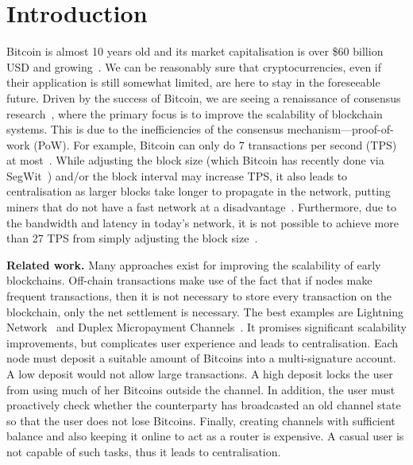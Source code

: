 \section{Introduction}

Bitcoin is almost 10 years old and its market capitalisation is over \$60 billion USD and growing~\cite{bitcoinmarketcap}.
We can be reasonably sure that cryptocurrencies,
even if their application is still somewhat limited,
are here to stay in the foreseeable future.
Driven by the success of Bitcoin, we are seeing a renaissance of consensus research~\cite{miller2016honey, kogias2016enhancing, kokoris2017omniledger},
where the primary focus is to improve the scalability of blockchain systems.
This is due to the inefficiencies of the consensus mechanism---proof-of-work (PoW).
For example, Bitcoin can only do 7 transactions per second (TPS) at most~\cite{vukolic2015quest}.
While adjusting the block size (which Bitcoin has recently done via SegWit~\cite{segwit}) and/or the block interval may increase TPS,
it also leads to centralisation as larger blocks take longer to propagate in the network,
putting miners that do not have a fast network at a disadvantage~\cite{croman2016scaling}.
Furthermore, due to the bandwidth and latency in today's network,
it is not possible to achieve more than 27 TPS from simply adjusting the block size~\cite{croman2016scaling}.

\textbf{Related work.\quad}
Many approaches exist for improving the scalability of early blockchains.
Off-chain transactions make use of the fact that if nodes make frequent transactions,
then it is not necessary to store every transaction on the blockchain,
only the net settlement is necessary.
The best examples are Lightning Network~\cite{lightningnetwork} and Duplex Micropayment Channels~\cite{decker2015fast}.
It promises significant scalability improvements, but complicates user experience and leads to centralisation.
Each node must deposit a suitable amount of Bitcoins into a multi-signature account.
A low deposit would not allow large transactions.
A high deposit locks the user from using much of her Bitcoins outside the channel.
In addition, the user must proactively check whether the counterparty has broadcasted an old channel state so that the user does not lose Bitcoins.
Finally, creating channels with sufficient balance and also keeping it online to act as a router is expensive.
A casual user is not capable of such tasks, thus it leads to centralisation.

